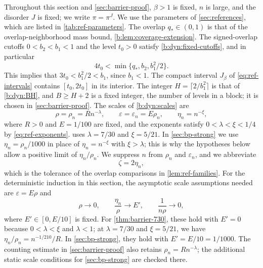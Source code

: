 Throughout this section and \cref{sec:barrier-proof}, $\beta>1$ is fixed, $n$ is large, and the disorder $J$ is fixed; we write $\pi=\pi^J$. We use the parameters of \cref{sec:references}, which are listed in \cref{tab:ref-parameters}. The overlap $q_*\in(0,1)$ is that of the overlap-neighborhood mass bound, \cref{b:lem:coverage-extension}. The signed-overlap cutoffs $0<b_2<b_1<1$ and the level $t_0>0$ satisfy \eqref{b:dyn:fixed-cutoffs}, and in particular
\[
 4t_0<\min\{q_*,b_2,b_1^2/2\}.
\]
This implies that $3t_0<b_1^2/2<b_1$, since $b_1<1$. The compact interval $J_\beta$ of \eqref{eq:ref-intervals} contains $[t_0,2t_0]$ in its interior. The integer $H=\lceil2/b_1^2\rceil$ is that of \eqref{b:dyn:BH}, and $B\ge H+2$ is a fixed integer, the number of levels in a block; it is chosen in \cref{sec:barrier-proof}. The scales of \eqref{b:dyn:scales} are
\[
 \rho=\rho_n=Rn^{-\lambda},\qquad \varepsilon=\varepsilon_n=E\rho_n,\qquad \eta_n=n^{-\xi},
\]
where $R>0$ and $E=1/100$ are fixed, and the exponents satisfy $0<\lambda<\xi<1/4$ by \eqref{eq:ref-exponents}.  uses $\lambda=7/30$ and $\xi=5/21$. In \cref{sec:bp-strong} we use $\eta_n=\rho_n/1000$ in place of $\eta_n=n^{-\xi}$ with $\xi>\lambda$; this is why the hypotheses below allow a positive limit of $\eta_n/\rho_n$. We suppress $n$ from $\rho_n$ and $\varepsilon_n$, and we abbreviate
\[
 \zeta=2\eta_n,
\]
which is the tolerance of the overlap comparisons in \cref{lem:ref-families}. For the deterministic induction in this section, the asymptotic scale assumptions needed are $\varepsilon=E\rho$ and
\begin{equation}\label{eq:ind-scales}
 \rho\to0,\qquad \frac{\eta_n}{\rho}\to E',\qquad \frac1{n\rho}\to0,
\end{equation}
where $E'\in[0,E/10]$ is fixed. For \cref{thm:barrier-730}, these hold with $E'=0$ because $0<\lambda<\xi$ and $\lambda<1$; at $\lambda=7/30$ and $\xi=5/21$, we have $\eta_n/\rho_n=n^{-1/210}/R$. In \cref{sec:bp-strong}, they hold with $E'=E/10=1/1000$. The counting estimate in \cref{sec:barrier-proof} also retains $\rho_n=Rn^{-\lambda}$; the additional static scale conditions for \cref{sec:bp-strong} are checked there.

